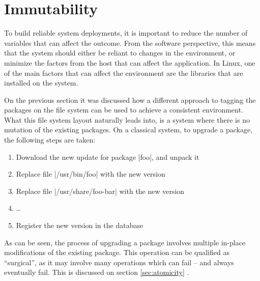 \FloatBarrier
\section{Immutability}

To build reliable system deployments, it is important to reduce the
number of variables that can affect the outcome. From the
software perspective, this means that the system should
either be reliant to changes in the environment, or minimize
the factors from the host that can affect the application.
In Linux, one of the main factors that can affect the
environment are the libraries that are installed on the
system.

On the previous section it was discussed how a different
approach to tagging the packages on the file system can be
used to achieve a consistent environment. What this
file system layout naturally leads into, is a system where
there is no mutation of the existing packages. On a
classical system, to upgrade a package, the following steps
are taken:

\begin{enumerate}
    \item Download the new update for package |foo|, and unpack it
    \item Replace file |/usr/bin/foo| with the new version
    \item Replace file |/usr/share/foo-bar| with the new version
    \item \ldots
    \item Register the new version in the database
\end{enumerate}

As can be seen, the process of upgrading a package involves
multiple in-place modifications of the existing package.
This operation can be qualified as ``surgical'', as it may
involve many operations which can fail -- and always
eventually fail. This is discussed on section
\ref{sec:atomicity} .

